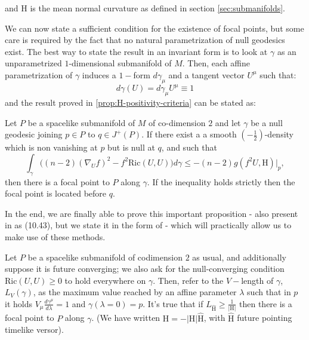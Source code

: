 	and \(\mathrm{H}\) is the mean normal curvature as defined in section \ref{sec:submanifolds}.

	We can now state a sufficient condition for the existence of focal points, but some care is required by the fact that no natural parametrization of null geodesics exist.
	The best way to state the result in an invariant form is to look at \(\gamma\) as an unparametrized \(1\)-dimensional submanifold of \(M\).
	Then, each affine parametrization of \(\gamma\) induces a \(1-\)form \(d\gamma_{\mu}\) and a tangent vector \(U^{\mu}\) such that:
	\[
	d\gamma(U) = d\gamma_{\mu}U^{\mu} \equiv 1
	\]
	and the result proved in \ref{prop:H-positivity-criteria} can be stated as:
	\begin{prop}
		\label{prop:fp-criteria}
		Let \(P\) be a spacelike submanifold of \(M\) of co-dimension \(2\) and let \(\gamma\) be a null geodesic joining \(p \in P\) to \(q\in J^+(P)\). If there exist a a smooth \((-\frac{1}{2})\)-density which is non vanishing at \(p\) but is null at \(q\), and such that
		\begin{equation}
		\label{eq:fp-criteria}
		\int_{\gamma} \big((n -2)(\nabla_Uf)^2 - f^2\text{Ric}(U, U) \big)d\gamma\le -(n -2) g(f^2 U, \mathrm{H})\Big\vert_{p},
		\end{equation}
		then there is a focal point to \(P\) along \(\gamma\). If the inequality holds strictly then the focal point is located before \(q\).
	\end{prop}

	In the end, we are finally able to prove this important proposition - also present in \cite{o1983semi} as (10.43), but we state it in the form of \cite{fewster2020new}- which will practically allow us to make use of these methods.
	\begin{corollary}
		\label{cor:fp-criteria}
		Let \(P\) be a spacelike submanifold of codimension \(2\) as usual, and additionally suppose it is future converging; we also ask for the null-converging condition \(\text{Ric}(U, U) \ge 0\) to hold everywhere on \(\gamma\). Then, refer to the \(V-\)length of \(\gamma\), \(L_V(\gamma)\), as the maximum value reached by an affine parameter \(\lambda\) such that in \(p\) it holds \(V_{\mu}\frac{d\gamma^{\mu}}{d\lambda} = 1\) and \(\gamma(\lambda = 0) = p\). It's true that if \(L_{\hat{\mathrm{H}}} \ge \frac{1}{|\mathrm{H}|}\) then there is a focal point to \(P\) along \(\gamma\). (We have written \(\mathrm{H} = - |\mathrm{H}|\hat{\mathrm{H}}\), with \(\hat{\mathrm{H}}\) future pointing timelike versor).
	\end{corollary}

